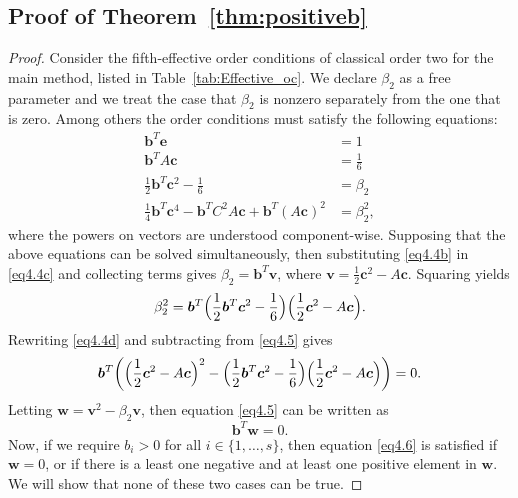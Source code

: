 \subsection{Proof of Theorem~\ref{thm:positiveb}}
\begin{proof}
    Consider the fifth-effective order conditions of classical order two for the main method, listed in Table~\ref{tab:Effective_oc}. We declare \( \beta_{2} \) as a free parameter and we treat the case that \( \beta_{2} \) is nonzero separately from the one that is zero. Among others the order conditions must satisfy the following equations:
    \begin{subequations}\label{eq4.4}
        \begin{align}
            \bm{b}^{T}\bm{e} &= 1 \label{eq4.4a} \\
            \bm{b}^{T}A\bm{c} &= \frac{1}{6} \label{eq4.4b} \\
            \frac{1}{2}\bm{b}^{T}\bm{c}^{2} - \frac{1}{6} &= \beta_{2} \label{eq4.4c} \\
            \frac{1}{4}\bm{b}^{T}\bm{c}^{4} - \bm{b}^{T}C^{2}A\bm{c} + \bm{b}^{T}(A\bm{c})^{2} &= \beta_{2}^{2}, \label{eq4.4d}
        \end{align}
    \end{subequations}
    where the powers on vectors are understood component-wise. Supposing that the above equations can be solved simultaneously, then substituting \eqref{eq4.4b} in \eqref{eq4.4c} and collecting terms gives \( \beta_{2} = \bm{b}^{T}\bm{v} \), where \( \bm{v} = \frac{1}{2}\bm{c}^{2} - A\bm{c} \). Squaring yields
    \begin{equation}\label{eq4.5}
        \beta_{2}^{2} = \bm{b}^{T}\Bigl(\frac{1}{2}\bm{b}^{T}\bm{c}^{2} - \frac{1}{6}\Bigr)\Bigl(\frac{1}{2}\bm{c}^{2} - A\bm{c}\Bigr).
    \end{equation}
    Rewriting \eqref{eq4.4d} and subtracting from \eqref{eq4.5} gives
    \begin{equation}
        \bm{b}^{T}\biggl(\Bigl(\frac{1}{2}\bm{c}^{2} - A\bm{c}\Bigr)^{2} - \Bigl(\frac{1}{2}\bm{b}^{T}\bm{c}^{2} - \frac{1}{6}\Bigr)\Bigl(\frac{1}{2}\bm{c}^{2} - A\bm{c}\Bigr)\biggr) = 0.
    \end{equation}
    Letting \( \bm{w} = \bm{v}^{2} - \beta_{2}\bm{v} \), then equation \eqref{eq4.5} can be written as
    \begin{equation}\label{eq4.6}
        \bm{b}^{T}\bm{w} = 0.
    \end{equation}
    Now, if we require \( b_{i} > 0 \) for all \( i \in \{1,\dots, s\} \), then equation \eqref{eq4.6} is satisfied if \( \bm{w} = 0 \), or if there is a least one negative and at least one positive element in \( \bm{w} \). We will show that none of these two cases can be true.
    \newline


\end{proof}
